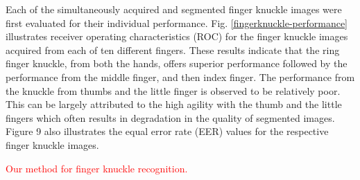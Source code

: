 Each of the simultaneously acquired and segmented finger knuckle images were first evaluated for their individual performance. Fig. \ref{fingerknuckle-performance} illustrates receiver operating characteristics (ROC) for the finger knuckle images acquired from each of ten different fingers.  These results indicate that the ring finger knuckle, from both the hands, offers superior performance followed by the performance from the middle finger, and then index finger. The performance from the knuckle from thumbs and the little finger is observed to be relatively poor. This can be largely attributed to the high agility with the thumb and the little fingers which often results in degradation in the quality of segmented images. Figure 9 also illustrates the equal error rate (EER) values for the respective finger knuckle images. 

\textcolor{red}{Our method for finger knuckle recognition.}

